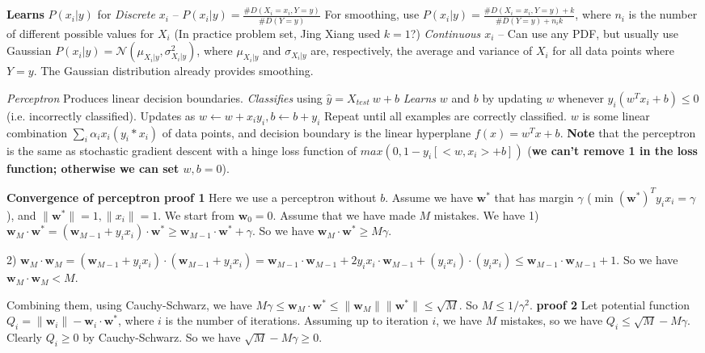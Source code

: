 \documentclass[10pt,landscape]{article}
\newcommand{\vect}[1]{\boldsymbol{#1}}
\begin{document}
\begin{multicols}{3}
\textbf{Learns} $P(x_i | y)$ for \emph{Discrete $x_i$} -- $P(x_i | y) = \frac{\#D(X_i = x_i, Y = y)}{\#D(Y = y)}$ 
For smoothing, use $P(x_i | y) = \frac{\#D(X_i = x_i, Y = y) + k}{\#D(Y = y) + n_i k}$, where $n_i$ is the number of different possible values for $X_i$ (In practice problem set, Jing Xiang used $k=1$?)
\emph{Continuous $x_i$} -- Can use any PDF, but usually use Gaussian $P(x_i | y) = \mathcal{N}(\mu_{X_i | y}, \sigma_{X_i | y}^2)$, where $\mu_{X_i | y}$ and $\sigma_{X_i | y}$ are, respectively, the average and variance of $X_i$ for all data points where $Y = y$. The Gaussian distribution already provides smoothing.

\emph{Perceptron} Produces linear decision boundaries. \emph{Classifies} using $\hat{y} = X_{test}\:w + b$ \emph{Learns} $w$ and $b$ by updating $w$ whenever $y_i (w^T x_i + b) \leq 0$ (i.e. incorrectly classified). Updates as  $w \leftarrow w + x_i y_i, b \leftarrow b + y_i$ Repeat until all examples are correctly classified. $w$ is some linear combination $\sum_{i} \alpha_i x_i (y_i * x_i) $ of data points, and decision boundary is the linear hyperplane $f(x) = w^T x + b$. \textbf{Note} that the perceptron is the same as stochastic gradient descent with a hinge loss function of $max(0, 1 - y_i [<w, x_i> + b])$ (\textbf{we can't remove 1 in the loss function; otherwise we can set $w,b=0$}).

\textbf{Convergence of perceptron proof 1} Here we use a perceptron without $b$. Assume we have $\vect{w}^*$ that has margin $\gamma$ ($\min (\vect{w}^*)^T y_i x_i  = \gamma $ ), and $\|\vect{w}^*\| = 1, \|x_i\| = 1$. We start from $\vect{w}_0 = 0$. Assume that we have made $M$ mistakes. We have 1) $\vect{w}_M \cdot \vect{w}^*  = (\vect{w}_{M-1} + y_i x_i)\cdot \vect{w}^* \geq \vect{w}_{M-1} \cdot \vect{w}^* + \gamma$. So we have $\vect{w}_M \cdot \vect{w}^* \geq M \gamma$. 

2) $\vect{w}_M \cdot \vect{w}_M = (\vect{w}_{M-1} + y_i x_i)\cdot (\vect{w}_{M-1} + y_i x_i) = \vect{w}_{M-1} \cdot \vect{w}_{M-1} + 2 y_i x_i \cdot \vect{w}_{M-1} + (y_i x_i) \cdot (y_i x_i) \leq  \vect{w}_{M-1} \cdot \vect{w}_{M-1} + 1$. So we have $\vect{w}_M \cdot \vect{w}_M < M$. 

Combining them, using Cauchy-Schwarz, we have $M\gamma \leq \vect{w}_M \cdot \vect{w}^* \leq \|\vect{w}_M\|  \|\vect{w}^*\| \leq \sqrt{M}$. So $M \leq 1/\gamma^2$.
\textbf{proof 2} Let potential function $Q_i = \|\vect{w}_i\| - \vect{w}_i \cdot \vect{w}^*$, where $i$ is the number of iterations. Assuming up to iteration $i$, we have $M$ mistakes, so we have $Q_i \leq \sqrt{M} - M\gamma$. Clearly $Q_i \geq 0$ by Cauchy-Schwarz. So we have $\sqrt{M} - M\gamma \geq 0$.


\end{multicols}
\end{document}
